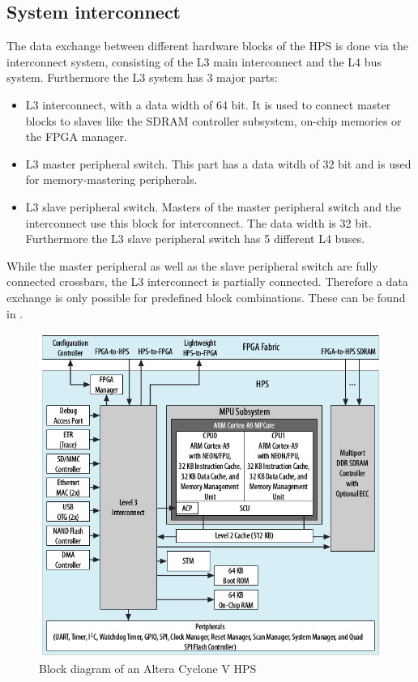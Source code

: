 \subsection{System interconnect}
The data exchange between different hardware blocks of the HPS is done via the interconnect system, consisting of the L3 main interconnect and the L4 bus system. Furthermore the L3 system has 3 major parts:
\begin{itemize}
\item L3 interconnect, with a data width of 64 bit. It is used to connect master blocks to slaves like the SDRAM controller subsystem, on-chip memories or the FPGA manager.
\item L3 master peripheral switch. This part has a data witdh of 32 bit and is used for memory-mastering peripherals.
\item L3 slave peripheral switch. Masters of the master peripheral switch and the interconnect use this block for interconnect. The data width is 32 bit. Furthermore the L3 slave peripheral switch has 5 different L4 buses.
\end{itemize}
While the master peripheral as well as the slave peripheral switch are fully connected crossbars, the L3 interconnect is partially connected. Therefore a data exchange is only possible for predefined block combinations. These can be found in \cite[chapter 7]{AlteraHPS15}.
\begin{figure}[htbp]
\begin{center}
\includegraphics[width=15cm,keepaspectratio=true]{bilder/png/AlteraHPSneu}
\caption{Block diagram of an Altera Cyclone V HPS\cite{altcycvov15}}
\label{fig:alterahpsblocks}
\end{center}
\end{figure}
